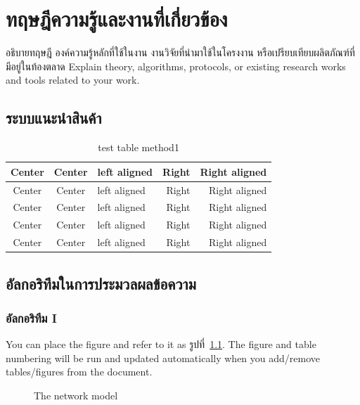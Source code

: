 \documentclass[12pt,oneside,openright,a4paper]{cpe-thai-project}
\begin{document}
\chapter{ทฤษฎีความรู้และงานที่เกี่ยวข้อง}

อธิบายทฤษฎี องค์ความรู้หลักที่ใช้ในงาน งานวิจัยที่นำมาใช้ในโครงงาน หรือเปรียบเทียบผลิตภัณฑ์ที่มีอยู่ในท้องตลาด
Explain theory, algorithms, protocols, or existing research works and tools related to your work. 

\section{ระบบแนะนำสินค้า}

\begin{table}[!h]
\caption{test table method1}\label{tbl:method1}
\begin{tabular}{c|c|l|rr} \hline\hline
Center & Center & left aligned & Right & Right aligned \\ \hline\hline
Center & Center & left aligned & Right & Right aligned \\ \hline
Center & Center & left aligned & Right & Right aligned \\ 
Center & Center & left aligned & Right & Right aligned \\ \hline
Center & Center & left aligned & Right & Right aligned \\ \hline\hline
\end{tabular}
\end{table}


\section{อัลกอริทึมในการประมวลผลข้อความ}
\subsection{อัลกอริทึม I}

You can place the figure and refer to it as รูปที่~\ref{fig:model2}.
The figure and table numbering will be run and updated automatically when you add/remove tables/figures from the document.

\begin{figure}[!h]\centering
\setlength{\fboxrule}{0.2mm} %
\setlength{\fboxsep}{1cm}
\caption{The network model}\label{fig:model2}
\end{figure}
\end{document}
